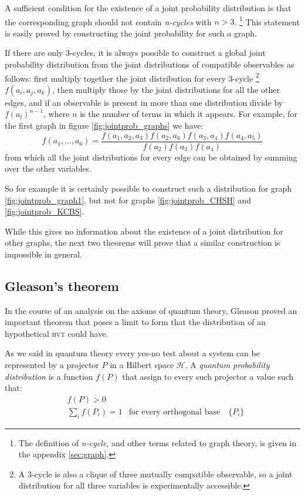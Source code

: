 \documentclass[a4paper]{article}
\newcommand{\Hil}{\mathcal{H}}
\newcommand{\acron}[1]{\textsc{#1}}
\newcommand{\HVT}{\acron{hvt}}
\theoremstyle{definition}
\let\oldproof\proof
\let\oldendproof\endproof
\renewenvironment{proof}
    {
        \begin{framed} 
        \oldproof
    }
    {
        \oldendproof 
        \end{framed}
    }
\begin{document}
A sufficient condition for the existence of a joint probability
distribution is that the corresponding graph should not contain \emph{n-cycles} with $n>3$.
\footnote{The definition of \emph{n-cycle}, and other terms related to graph
theory, is given in the appendix \ref{sec:graph}.}
This statement is easily proved by constructing the joint probability for such a
graph.
\begin{proof}
If there are only 3-cycles, it is always possible to construct a global joint
probability distribution from the joint distributions of compatible observables
as follows:
first multiply together the joint distribution for every 3-cycle 
\footnote{A 3-cycle is also a clique of three mutually compatible observable, so a
joint distribution for all three variables is experimentally accessible.}
$f(a_i, a_j,a_k)$, then multiply those by the joint distributions for all the other edges,
and if an observable is present in more than one distribution divide by
$f(a_l)^{n-1}$, where $n$ is the number of terms in which it appears.
For example, for the first graph in figure \ref{fig:jointprob_graphs} we have:
\begin{equation}
    f(a_1,\ldots,a_6) = \frac{f(a_1,a_2,a_3) f(a_2, a_6) f(a_3,a_4)
    f(a_4,a_5)}{f(a_2) f(a_3) f(a_4)}
    \label{eq:jointprob_graph1}
\end{equation}
from which all the joint distributions for every edge can be obtained by summing
over the other variables.
\end{proof}
So for example it is certainly possible to construct such a distribution for
graph \ref{fig:jointprob_graph1}, but not for graphs \ref{fig:jointprob_CHSH}
and \ref{fig:jointprob_KCBS}.

While this gives no information about the existence of a joint distribution for
other graphs, the next two theorems will prove that a
similar construction is impossible in general.

\subsection{Gleason's theorem}
In the course of an analysis on the axioms of quantum theory,
Gleason proved an important theorem that poses a limit to form that the
distribution of an hypothetical \HVT{} could have.

As we said in quantum theory every yes-no test about a system can be represented by a
projector $P$ in a Hilbert space $\Hil$.
A \emph{quantum probability distribution} is a function $f(P)$ that assign to every
such projector a value such that:
\begin{align}
    &f(P) > 0 \\
    &\sum_i f(P_i) = 1 & \text{for every orthogonal base} \quad \{P_i\}
    \label{eq:gleason_th_hypotesis}
\end{align}
\end{document}
